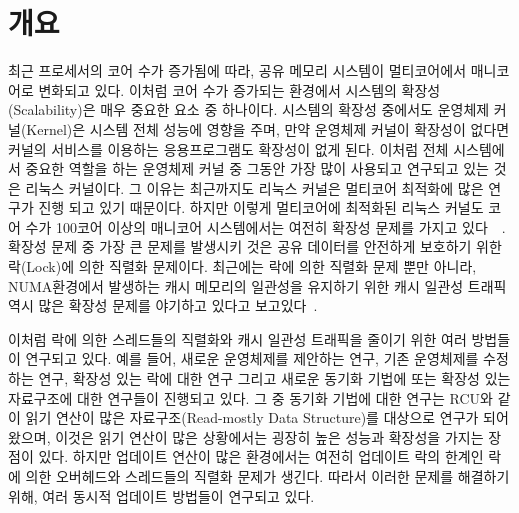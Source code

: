 \section{개요} \label{sec:intro}

최근 프로세서의 코어 수가 증가됨에 따라, 공유 메모리 시스템이 멀티코어에서 매니코어로 변화되고 있다.
이처럼 코어 수가 증가되는 환경에서 시스템의 확장성(Scalability)은 매우 중요한 요소 중 하나이다.
시스템의 확장성 중에서도 운영체제 커널(Kernel)은 시스템 전체 성능에 영향을 주며, 
만약 운영체제 커널이 확장성이 없다면 커널의 서비스를 이용하는 응용프로그램도 확장성이 없게 된다.
이처럼 전체 시스템에서 중요한 역할을 하는 운영체제 커널 중 그동안 가장 많이 사용되고 연구되고 있는 것은 
리눅스 커널이다. 
그 이유는 최근까지도 리눅스 커널은 멀티코어 최적화에 많은 연구가 진행 되고 있기 때문이다. 
하지만 이렇게 멀티코어에 최적화된 리눅스 커널도 코어 수가 100코어 이상의 매니코어 
시스템에서는 여전히 확장성 문제를 가지고 있다~\cite{SilasBoydWickizer2010LinuxScales48}~\cite{Changwoo2016UMSF}.
확장성 문제 중 가장 큰 문제를 발생시키 것은 공유 데이터를 안전하게 보호하기 
위한 락(Lock)에 의한 직렬화 문제이다.
최근에는 락에 의한 직렬화 문제 뿐만 아니라, NUMA환경에서 발생하는 캐시 메모리의 일관성을 
유지하기 위한 캐시 일관성 트래픽 역시 많은 확장성 문제를
야기하고 있다고 보고있다\cite{mckenney2011parallel}~\cite{SilasBoydWickizerPth}.

이처럼 락에 의한 스레드들의 직렬화와 캐시 일관성 트래픽을 줄이기 위한 여러 방법들이 연구되고
있다.
예를 들어, 새로운 운영체제를 제안하는 연구, 기존 운영체제를 수정하는 연구, 확장성 있는 락에 대한 연구 
그리고 새로운 동기화 기법에 또는 확장성 있는 자료구조에 대한 연구들이 진행되고 있다.
그 중 동기화 기법에 대한 연구는 RCU와 같이 읽기 연산이 많은 자료구조(Read-mostly Data Structure)를 
대상으로 연구가 되어왔으며, 이것은 읽기 연산이 많은 상황에서는 굉장히 높은 성능과 확장성을 가지는 장점이 있다.
하지만 업데이트 연산이 많은 환경에서는 여전히 업데이트 락의 한계인 락에 의한 오버헤드와 스레드들의 
직렬화 문제가 생긴다. 
따라서 이러한 문제를 해결하기 위해, 여러 동시적 업데이트 방법들이 연구되고 있다.

